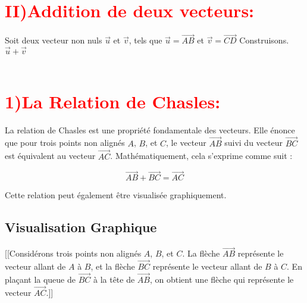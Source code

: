 \documentclass[12pt]{article}
\begin{document}
\section*{\textcolor{red}{\textbf{II)Addition de deux vecteurs:}}}
Soit deux vecteur non nuls $\vec{u}$ et $\vec{v}$, tels que $\vec{u}=\vec{AB}$ et $\vec{v}=\vec{CD}$ Construisons.\\ $\vec{u}+\vec{v}$\\
\\

\section*{\textcolor{red}{\textbf{1)La Relation de Chasles:}}}

La relation de Chasles est une propriété fondamentale des vecteurs. Elle énonce que pour trois points non alignés \(A\), \(B\), et \(C\), le vecteur \(\vec{AB}\) suivi du vecteur \(\vec{BC}\) est équivalent au vecteur \(\vec{AC}\). Mathématiquement, cela s'exprime comme suit :

\[
\vec{AB} + \vec{BC} = \vec{AC}
\]

Cette relation peut également être visualisée graphiquement.

\subsection*{Visualisation Graphique}

[[Considérons trois points non alignés \(A\), \(B\), et \(C\). La flèche \(\vec{AB}\) représente le vecteur allant de \(A\) à \(B\), et la flèche \(\vec{BC}\) représente le vecteur allant de \(B\) à \(C\). En plaçant la queue de \(\vec{BC}\) à la tête de \(\vec{AB}\), on obtient une flèche qui représente le vecteur \(\vec{AC}\).]]

\begin{center}
\end{center}
\end{document}
